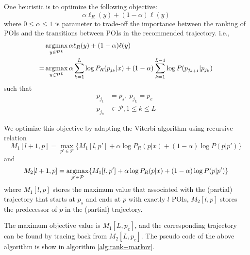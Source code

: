 One heuristic is to optimize the following objective:
\begin{displaymath}
    \alpha \ell_R(y) + (1-\alpha) \ell(y)
\end{displaymath}
where $0 \le \alpha \le 1$ is parameter to trade-off the importance between the ranking of POIs
and the transitions between POIs in the recommended trajectory.
i.e.,
\begin{align*}
    & \operatorname*{argmax}_{y \in \mathcal{P}^L} \alpha \ell_R(y) + (1-\alpha) \ell(y) \\
   =& \operatorname*{argmax}_{y \in \mathcal{P}^L} \alpha \sum_{k=1}^{L} \log P_R(p_{j_k} | x) +
                                    (1-\alpha) \sum_{k=1}^{L-1} \log P(p_{j_{k+1}} | p_{j_k})
\end{align*}
such that
\begin{align*}
    p_{j_1} &= p_s, ~ p_{j_L} = p_e \\
    p_{j_k} &\in \mathcal{P}, 1 \le k \le L
\end{align*}

We optimize this objective by adapting the Viterbi algorithm using recursive relation
\begin{equation}
    \label{eq:max}
    M_1[l+1, p] = \max_{p' \in \mathcal{P}} \{ M_1[l, p'] + \alpha \log P_R(p|x) + (1-\alpha) \log P(p|p') \}
\end{equation}
and
\begin{equation}
    \label{eq:argmax}
    M_2[l+1, p] = \operatorname*{argmax}_{p' \in \mathcal{P}} \{ M_1[l, p'] + \alpha \log P_R(p|x) + (1-\alpha) \log P(p|p') \}
\end{equation}
where $M_1[l, p]$ stores the maximum value that associated with the (partial) trajectory
that starts at $p_s$ and ends at $p$ with exactly $l$ POIs,
$M_2[l, p]$ stores the predecessor of $p$ in the (partial) trajectory.

The maximum objective value is $M_1[L, p_e]$,
and the corresponding trajectory can be found by tracing back from $M_2[L, p_e]$.
The pseudo code of the above algorithm is show in algorithm \ref{alg:rank+markov}.

